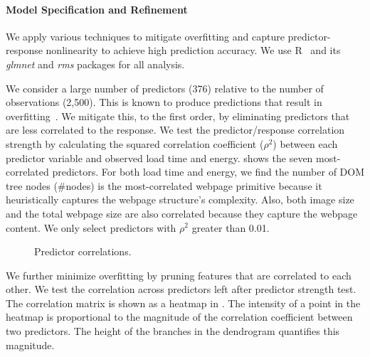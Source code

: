 \paragraph{Model Specification and Refinement} We apply various techniques to mitigate overfitting and capture predictor-response nonlinearity to achieve high prediction accuracy. We use R~\cite{R} and its \textit{glmnet} and \textit{rms} packages for all analysis.

We consider a large number of predictors (376) relative to the number of observations (2,500). This is known to produce predictions that result in overfitting~\cite{ESL}. We mitigate this, to the first order, by eliminating predictors that are less correlated to the response. We test the predictor/response correlation strength by calculating the squared correlation coefficient ($\rho^2$) between each predictor variable and observed load time and energy.  shows the seven most-correlated predictors. For both load time and energy, we find the number of DOM tree nodes (\textsf{\#nodes}) is the most-correlated webpage primitive because it heuristically captures the webpage structure's complexity. Also, both image size and the total webpage size are also correlated because they capture the webpage content. We only select predictors with $\rho^2$ greater than 0.01.

\begin{figure}[t]
\hspace*{1pt}
\caption{Predictor correlations.}
\label{fig:pred_cor}
\end{figure}

We further minimize overfitting by pruning features that are correlated to each other.  We test the correlation across predictors left after predictor strength test.  The correlation matrix is shown as a heatmap in . The intensity of a point in the heatmap is proportional to the magnitude of the correlation coefficient between two predictors. The height of the branches in the dendrogram quantifies this magnitude.

